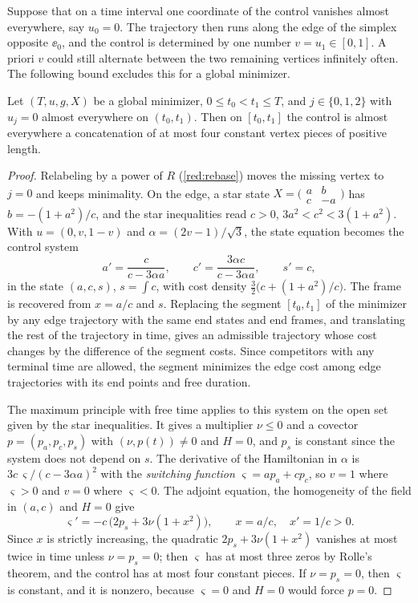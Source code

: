 Suppose that on a time interval one coordinate of the control vanishes almost everywhere, say
$u_0=0$. The trajectory then runs along the edge of the simplex opposite $\ee_0$, and the control is
determined by one number $v=u_1\in[0,1]$. A priori $v$ could still alternate between the two
remaining vertices infinitely often. The following bound excludes this for a global minimizer.

\begin{proposition}\label{prop:edge-bound}
Let $(T,u,g,X)$ be a global minimizer, $0\le t_0<t_1\le T$, and $j\in\{0,1,2\}$ with $u_j=0$ almost
everywhere on $(t_0,t_1)$. Then on $[t_0,t_1]$ the control is almost everywhere a concatenation of
at most four constant vertex pieces of positive length.
\end{proposition}

\begin{proof}
Relabeling by a power of $R$ (\cref{red:rebase}) moves the missing vertex to $j=0$ and keeps
minimality. On the edge, a star state $X=\bigl(\begin{smallmatrix}a&b\\c&-a\end{smallmatrix}\bigr)$
has $b=-(1+a^2)/c$, and the star inequalities read $c>0$, $3a^2<c^2<3(1+a^2)$. With
$u=(0,v,1-v)$ and $\alpha=(2v-1)/\sqrt3$, the state equation becomes the control system
\[
a'=\frac{c}{c-3\alpha a},\qquad c'=\frac{3\alpha c}{c-3\alpha a},\qquad s'=c,
\]
in the state $(a,c,s)$, $s=\int c$, with cost density $\frac32\bigl(c+(1+a^2)/c\bigr)$. The frame is recovered from $x=a/c$ and $s$. Replacing the segment $[t_0,t_1]$ of the minimizer by any
edge trajectory with the same end states and end frames, and translating the rest of the
trajectory in time, gives an admissible trajectory whose cost changes by the difference of the
segment costs. Since competitors with any terminal time are
allowed, the segment minimizes the edge cost among edge trajectories with its end points and free
duration.

The maximum principle with free time applies to this system on the open set given by the star
inequalities. It gives a multiplier $\nu\le0$ and a covector $p=(p_a,p_c,p_s)$ with
$(\nu,p(t))\ne0$ and $H=0$, and $p_s$ is constant since the system does not depend on $s$. The
derivative of the Hamiltonian in $\alpha$ is $3c\,\varsigma/(c-3\alpha a)^2$ with the
\emph{switching function} $\varsigma=ap_a+cp_c$, so $v=1$ where $\varsigma>0$ and $v=0$ where
$\varsigma<0$. The adjoint equation, the homogeneity of the field in $(a,c)$ and $H=0$ give
\[
\varsigma'=-c\,\bigl(2p_s+3\nu(1+x^2)\bigr),\qquad x=a/c,\quad x'=1/c>0.
\]
Since $x$ is strictly increasing, the quadratic $2p_s+3\nu(1+x^2)$ vanishes at most twice in time
unless $\nu=p_s=0$; then $\varsigma$ has at most three zeros by Rolle's theorem, and the control
has at most four constant pieces. If $\nu=p_s=0$, then $\varsigma$ is constant, and it is nonzero,
because $\varsigma=0$ and $H=0$ would force $p=0$.
\end{proof}

